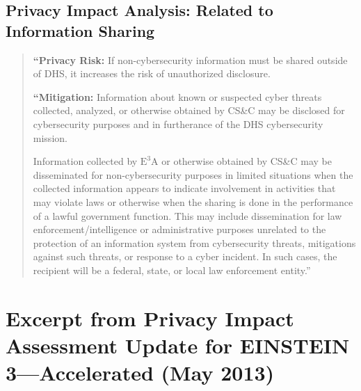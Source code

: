 \documentclass[fleqn,10pt]{wlscirep}
\newcommand{\ETA}{$\textrm{E}^\textrm{3}\textrm{A}$\xspace}
\begin{document}
\subsection{Privacy Impact Analysis: Related to Information Sharing}\label{excerpt3}
\begin{quote}
  \textbf{``Privacy Risk:} If non-cybersecurity information must be shared outside of DHS, it
increases the risk of unauthorized disclosure.

  \textbf{``Mitigation:} Information about known or suspected cyber threats collected,
analyzed, or otherwise obtained by CS\&C may be disclosed for cybersecurity purposes
and in furtherance of the DHS cybersecurity mission.

Information collected by \ETA or otherwise obtained by CS\&C may be
disseminated for non-cybersecurity purposes in limited situations when the collected
information appears to indicate involvement in activities that may violate laws or
otherwise when the sharing is done in the performance of a lawful government function.
This may include dissemination for law enforcement/intelligence or administrative
purposes unrelated to the protection of an information system from cybersecurity threats,
mitigations against such threats, or response to a cyber incident. In such cases, the
recipient will be a federal, state, or local law enforcement entity.''\cite[p.23]{dhs-e3a-pia}
\end{quote}


\section{Excerpt from Privacy Impact Assessment Update for EINSTEIN 3---Accelerated (May 2013)}
\end{document}
